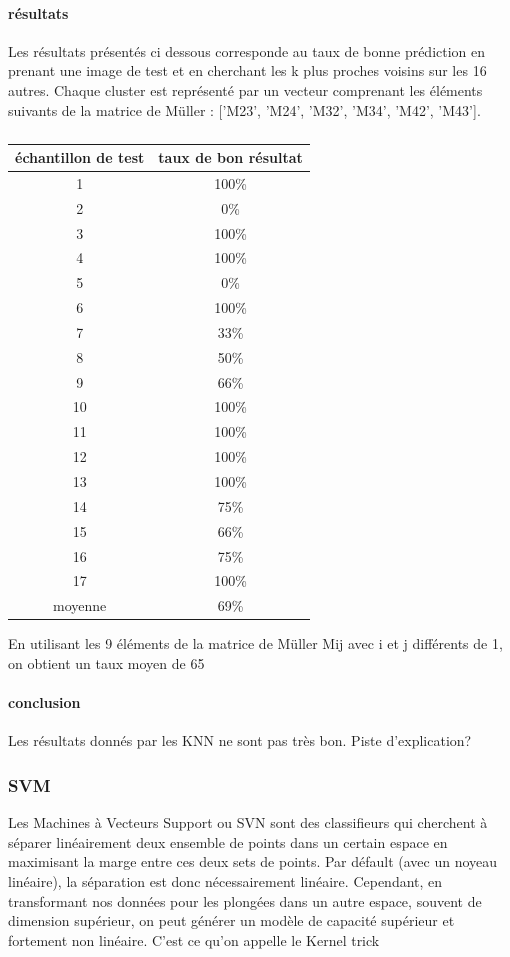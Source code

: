 \documentclass[a4paper,10pt]{report}
\begin{document}
\paragraph{résultats}
Les résultats présentés ci dessous corresponde au taux de bonne prédiction en prenant une image de test et en cherchant les k plus proches voisins sur les 16 autres. Chaque cluster est représenté par un vecteur comprenant les éléments suivants de la matrice de Müller : ['M23', 'M24', 'M32', 'M34', 'M42', 'M43'].
\subparagraph{}
\begin{center}
\begin{tabular}{|c|c|}  
  \hline
  échantillon de test & taux de bon résultat \\
  \hline
  1 & 100\%\\
  2 & 0\%\\
  3 & 100\%\\
  4 & 100\%\\
  5 & 0\%\\
  6  & 100\%\\
  7 & 33\%\\  
  8 & 50\%\\
  9 & 66\%\\
  10 & 100\%\\
  11 & 100\%\\
  12 & 100\%\\
  13 & 100\%\\
  14 & 75\%\\
  15 & 66\%\\
  16 & 75\%\\
  17 & 100\%\\
  \hline
  moyenne & 69\%\\  
  \hline
\end{tabular}
\end{center}

En utilisant les 9 éléments de la matrice de Müller Mij avec i et j différents de 1, on obtient un taux moyen de 65%
\paragraph{conclusion}
Les résultats donnés par les KNN ne sont pas très bon. Piste d'explication?

\subsubsection{SVM}
Les Machines à Vecteurs Support ou SVN sont des classifieurs qui cherchent à séparer linéairement deux ensemble de points dans un certain espace en maximisant la marge entre ces deux sets de points. Par défault (avec un noyeau linéaire), la séparation est donc nécessairement linéaire. Cependant, en transformant nos données pour les plongées dans un autre espace, souvent de dimension supérieur, on peut générer un modèle de capacité supérieur et fortement non linéaire. C'est ce qu'on appelle le Kernel trick
\end{document}
